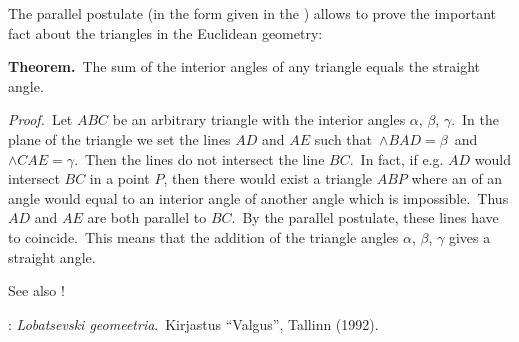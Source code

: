 \documentclass[12pt]{article}
\begin{document}
The parallel postulate (in the form given in the ) allows to prove the important fact about the triangles in the Euclidean geometry:

\textbf{Theorem.}\, The sum of the interior angles of any triangle equals the straight angle.

{\it Proof.}\, Let $ABC$ be an arbitrary triangle with the interior angles $\alpha$, $\beta$, $\gamma$.\, In the plane of the triangle we set the lines $AD$ and $AE$ such that\, $\wedge BAD = \beta$\, and\, $\wedge CAE = \gamma$.\, Then the lines do not intersect the line $BC$.\, In fact, if e.g. $AD$ would intersect $BC$ in a point $P$, then there would exist a triangle $ABP$ where an  of an angle would equal to an interior angle of another angle which is impossible.\, Thus $AD$ and $AE$ are both parallel to $BC$.\, By the parallel postulate, these lines have to coincide.\, This means that the addition of the triangle angles $\alpha$, $\beta$, $\gamma$ gives a straight angle.

See also !

\begin{thebibliography}{8}
: {\it Lobatsevski geomeetria}.\, Kirjastus ``Valgus'', Tallinn (1992).
\end{thebibliography} 
\end{document}
